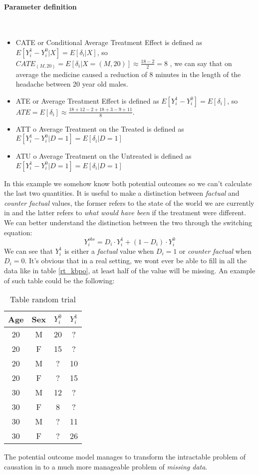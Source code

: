 \paragraph{Parameter definition} \hspace{0pt} \\
\label{parag:param}
\begin{itemize}
\item CATE or Conditional Average Treatment Effect is defined as $E[Y^{1}_i- Y^{0}_i|X] = E[\delta_i|X]$, so $CATE_{(M,20)}=E[\delta_i|X=(M,20)] \approx \frac{18-2}{2}=8$ , we can say that on average the medicine caused a reduction of 8 minutes in the length of the headache between 20 year old males.
\item ATE or Average Treatment Effect is defined as  $E[Y^{1}_i- Y^{0}_i] = E[\delta_i]$, so $ATE= E[\delta_i] \approx \frac{18+12-2+18+3-9+11}{8}$.
\item ATT o Average Treatment on the Treated is defined as  $E[Y^{1}_i- Y^{0}_i|D=1] = E[\delta_i|D=1]$ 
\item ATU o Average Treatment on the Untreated is defined as
$E[Y^{1}_i- Y^{0}_i|D=1] = E[\delta_i|D=1]$
\end{itemize}
In this example we somehow know both potential outcomes so we can't calculate the last two quantities.
It is useful to make a distinction between \textit{factual} and \textit{counter factual} values, the former refers to the state of the world we are currently in and the latter refers to \textit{what would have been} if the treatment were different.
We can better understand the distinction between the two through the switching equation: 
\begin{equation}
Y_i^{obs} = D_i \cdot Y^1_i + (1-D_i) \cdot Y^0_i
\label{eq:switching}
\end{equation}
We can see that $Y^1_i$ is either a \textit{factual} value when $D_i=1$ or \textit{counter factual} when $D_i=0$.
It's obvious that in a real setting, we wont ever be able to fill in all the data like in table \ref{rt_kbpo}, at least half of the value will be missing.
An example of such table could be the following:
\begin{table}[H]
\centering
\begin{tabular}{|c|c|c|c|}
\hline
Age & Sex & $Y^{0}_i$ & $Y^{1}_i$ \\ \hline
20 & M & 20 & ?  \\ \hline
20 & F & 15 & ? \\ \hline
20 & M & ? & 10 \\ \hline
20 & F & ? & 15  \\ \hline
30 & M & 12 & ? \\ \hline
30 & F & 8 & ? \\ \hline
30 & M & ? & 11   \\ \hline
30 & F & ? & 26 \\ \hline
\end{tabular}
\caption{Table random trial}
\end{table}
The potential outcome model manages to transform the intractable problem of causation in to a much more manageable problem of \textit{missing data}.

